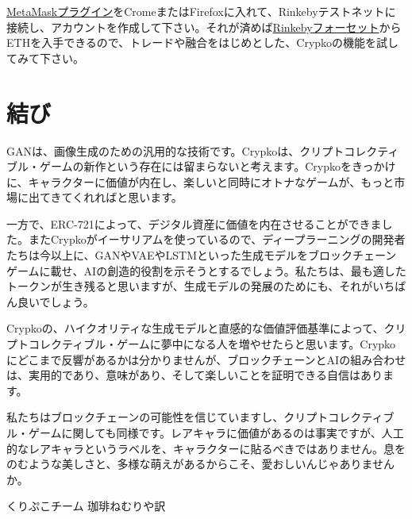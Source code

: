 \documentclass[a4paper]{article}
\begin{document}
\href{https://metamask.io/}{MetaMaskプラグイン}をCromeまたはFirefoxに入れて、Rinkebyテストネットに接続し、アカウントを作成して下さい。それが済めば\href{https://www.rinkeby.io/#faucet}{Rinkebyフォーセット}からETHを入手できるので、トレードや融合をはじめとした、Crypkoの機能を試してみて下さい。

\section{結び}

GANは、画像生成のための汎用的な技術です。Crypkoは、クリプトコレクティブル・ゲームの新作という存在には留まらないと考えます。Crypkoをきっかけに、キャラクターに価値が内在し、楽しいと同時にオトナなゲームが、もっと市場に出てきてくれればと思います。

一方で、ERC-721によって、デジタル資産に価値を内在させることができました。またCrypkoがイーサリアムを使っているので、ディープラーニングの開発者たちは今以上に、GANやVAEやLSTMといった生成モデルをブロックチェーンゲームに載せ、AIの創造的役割を示そうとするでしょう。私たちは、最も適したトークンが生き残ると思いますが、生成モデルの発展のためにも、それがいちばん良いでしょう。

Crypkoの、ハイクオリティな生成モデルと直感的な価値評価基準によって、クリプトコレクティブル・ゲームに夢中になる人を増やせたらと思います。Crypkoにどこまで反響があるかは分かりませんが、ブロックチェーンとAIの組み合わせは、実用的であり、意味があり、そして楽しいことを証明できる自信はあります。

私たちはブロックチェーンの可能性を信じていますし、クリプトコレクティブル・ゲームに関しても同様です。レアキャラに価値があるのは事実ですが、人工的なレアキャラというラベルを、キャラクターに貼るべきではありません。息をのむような美しさと、多様な萌えがあるからこそ、愛おしいんじゃありませんか。

\vspace{5mm}

\begin{flushright}
 くりぷこチーム
 珈琲ねむりや訳
\end{flushright}

\renewcommand\refname{参考文献}


\end{document}
